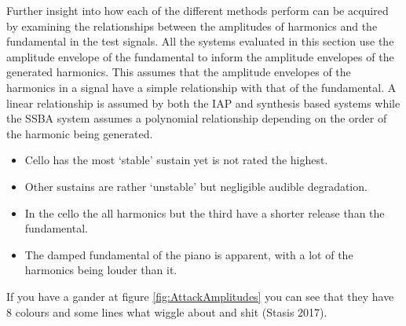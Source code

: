 		Further insight into how each of the different methods perform can be acquired by examining the
		relationships between the amplitudes of harmonics and the fundamental in the test signals. All the systems
		evaluated in this section use the amplitude envelope of the fundamental to inform the amplitude envelopes
		of the generated harmonics. This assumes that the amplitude envelopes of the harmonics in a signal have a
		simple relationship with that of the fundamental. A linear relationship is assumed by both the IAP and
		synthesis based systems while the SSBA system assumes a polynomial relationship depending on the order of
		the harmonic being generated.

		\note
		{
			\begin{itemize}
				\item Cello has the most `stable' sustain yet is not rated the highest.
				\item Other sustains are rather `unstable' but negligible audible degradation.
				\item In the cello the all harmonics but the third have a shorter release than the
					fundamental.
				\item The damped fundamental of the piano is apparent, with a lot of the harmonics being
					louder than it.
			\end{itemize}
		}

		\note
		{
			If you have a gander at figure \ref{fig:AttackAmplitudes} you can see that they have 8 colours and
			some lines what wiggle about and shit (Stasis 2017).
		}

